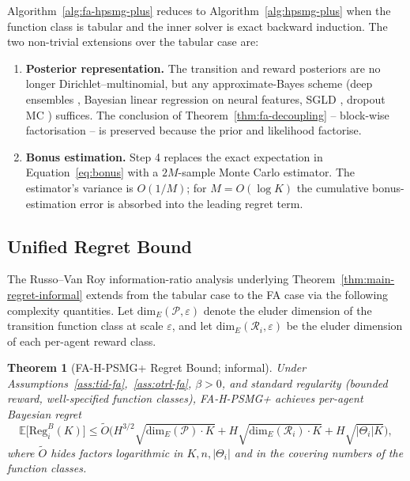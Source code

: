 \documentclass{article}
\newtheorem{theorem}{Theorem}[section]
\def\textsuperscript#1{#1}%
\begin{document}
Algorithm~\ref{alg:fa-hpsmg-plus} reduces to Algorithm~\ref{alg:hpsmg-plus} when the function class is tabular and the inner solver is exact backward induction. The two non-trivial extensions over the tabular case are:
\begin{enumerate}
\item \textbf{Posterior representation.} The transition and reward posteriors are no longer Dirichlet--multinomial, but any approximate-Bayes scheme (deep ensembles \citep{lakshminarayanan2017simple}, Bayesian linear regression on neural features, SGLD \citep{welling2011bayesian}, dropout MC \citep{gal2016dropout}) suffices. The conclusion of Theorem~\ref{thm:fa-decoupling} -- block-wise factorisation -- is preserved because the prior and likelihood factorise.
\item \textbf{Bonus estimation.} Step 4 replaces the exact expectation in Equation~\eqref{eq:bonus} with a $2M$-sample Monte Carlo estimator. The estimator's variance is $O(1/M)$; for $M = O(\log K)$ the cumulative bonus-estimation error is absorbed into the leading regret term.
\end{enumerate}

\subsection{Unified Regret Bound}
\label{app:fa-regret}

The Russo--Van Roy information-ratio analysis underlying Theorem~\ref{thm:main-regret-informal} extends from the tabular case to the FA case via the following complexity quantities. Let $\mathrm{dim}_E(\mathcal{P}, \varepsilon)$ denote the eluder dimension \citep{russo2014learning} of the transition function class at scale $\varepsilon$, and let $\mathrm{dim}_E(\mathcal{R}_i, \varepsilon)$ be the eluder dimension of each per-agent reward class.

\begin{theorem}[FA-H-PSMG\textsuperscript{+} Regret Bound; informal]
\label{thm:fa-regret-informal}
Under Assumptions~\ref{ass:tid-fa},~\ref{ass:otrl-fa}, $\beta > 0$, and standard regularity (bounded reward, well-specified function classes), FA-H-PSMG\textsuperscript{+} achieves per-agent Bayesian regret
\begin{equation}
\label{eq:fa-regret}
\mathbb{E}\big[\mathrm{Reg}_i^B(K)\big] \leq \tilde O\Big(H^{3/2} \sqrt{\mathrm{dim}_E(\mathcal{P}) \cdot K} + H \sqrt{\mathrm{dim}_E(\mathcal{R}_i) \cdot K} + H\sqrt{|\Theta_i| K}\Big),
\end{equation}
where $\tilde O$ hides factors logarithmic in $K, n, |\Theta_i|$ and in the covering numbers of the function classes.
\end{theorem}
\end{document}
